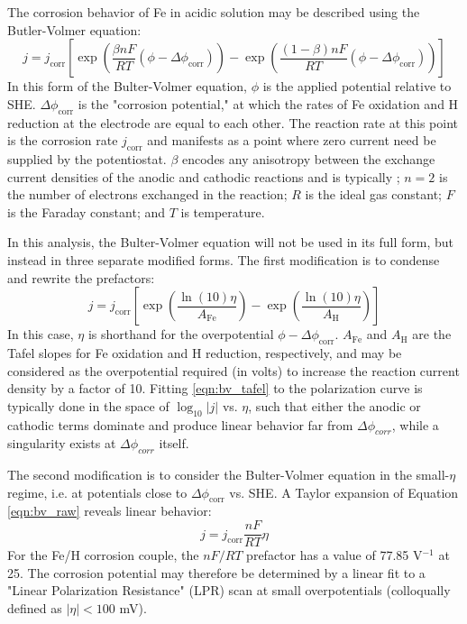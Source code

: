 The corrosion behavior of Fe in acidic solution may be described using the Butler-Volmer equation:
%
	\begin{equation}
		j = j_{\text{corr}} \left[
		\exp\left(\frac{\beta n F}{RT}(\phi - \Delta\phi_{\text{corr}})\right)
		-\exp\left(\frac{(1-\beta) n F}{RT}(\phi - \Delta\phi_{\text{corr}})\right)
		\right]
	\label{eqn:bv_raw}
	\end{equation}
%
In this form of the Bulter-Volmer equation, $\phi$ is the applied potential relative to SHE.  $\Delta \phi_{\text{corr}}$ is the "corrosion potential," at which the rates of Fe oxidation and H reduction at the electrode are equal to each other.  The reaction rate at this point is the corrosion rate $j_{\text{corr}}$ and manifests as a point where zero current need be supplied by the potentiostat.  $\beta$ encodes any anisotropy between the exchange current densities of the anodic and cathodic reactions and is typically ; $n = 2$ is the number of electrons exchanged in the reaction; $R$ is the ideal gas constant; $F$ is the Faraday constant; and $T$ is temperature.

In this analysis, the Bulter-Volmer equation will not be used in its full form, but instead in three separate modified forms.  The first modification is to condense and rewrite the prefactors:
%
	\begin{equation}
		j = j_{\text{corr}} \left[
		\exp\left(\frac{\ln(10)\eta}{A_{\text{Fe}}}\right)
		-\exp\left(\frac{\ln(10)\eta}{A_{\text{H}}}\right)
		\right]
	\label{eqn:bv_tafel}
	\end{equation}
%
In this case, $\eta$ is shorthand for the overpotential $\phi - \Delta\phi_{\text{corr}}$.  $A_{\text{Fe}}$ and $A_{\text{H}}$ are the Tafel slopes for Fe oxidation and H reduction, respectively, and may be considered as the overpotential required (in volts) to increase the reaction current density by a factor of 10.  Fitting \ref{eqn:bv_tafel} to the polarization curve is typically done in the space of $\log_{10}|j|$ vs. $\eta$, such that either the anodic or cathodic terms dominate and produce linear behavior far from $\Delta \phi_{corr}$, while a singularity exists at $\Delta \phi_{corr}$ itself.

The second modification is to consider the Bulter-Volmer equation in the small-$\eta$ regime, i.e. at potentials close to $\Delta \phi_{\text{corr}}$ vs. SHE.  A Taylor expansion of Equation \ref{eqn:bv_raw} reveals linear behavior:
%
	\begin{equation}
		j = j_{\text{corr}}\frac{nF}{RT}\eta
	\label{eqn:bv_lpr}
	\end{equation}
%
For the Fe/H corrosion couple, the $nF/RT$ prefactor has a value of 77.85 V$^{-1}$ at 25. The corrosion potential may therefore be determined by a linear fit to a "Linear Polarization Resistance" (LPR) scan at small overpotentials (colloqually defined as $|\eta| < 100$ mV).

